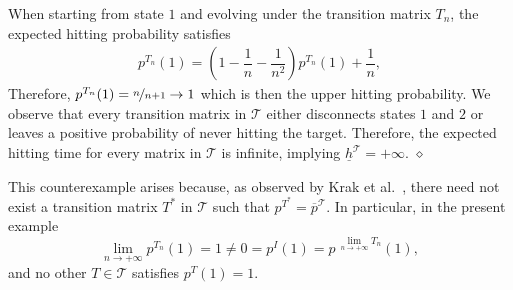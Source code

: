 \documentclass{svproc}
\newcommand{\T}{\mathcal{T}}
\newcommand{\olp}{\overline{p}}
\newcommand{\ulh}{\underline{h}}
\begin{document}
\begin{example}
\begin{center}
    \end{center}
    When starting from state ${1}$ and evolving under the transition matrix $T_n$, the expected hitting probability satisfies
    \begin{align*}
        p^{T_n}(1)=\left(1-\dfrac{1}{n}-\dfrac{1}{n^2}\right)p^{T_n}(1) +\dfrac{1}{n},
    \end{align*}
    Therefore, $p^{T_n}(1)=\nicefrac{n}{n+1} \to 1$ which is then the upper hitting probability. We observe that every transition matrix in $\T$ either disconnects states $1$ and $2$ or leaves a positive probability of never hitting the target. Therefore, the expected hitting time for every matrix in $\T$ is infinite, implying $\ulh^\T=+\infty$. \hfill$\diamond$
\end{example}
This counterexample arises because, as observed by Krak et al.~\cite{krak2019hitting}, there need not exist a transition matrix $T^*$ in $\T$ such that ${p^{T^*}=\olp^\T}$. In particular, in the present example
\[
{\lim_{n\to +\infty}p^{T_n}(1)=1\ne 0= p^I(1)=p \,^{\lim\limits_{n\to +\infty}T_n}(1),}
\]
and no other $T\in\T$ satisfies $p^{T}(1)=1$. 
\end{document}
